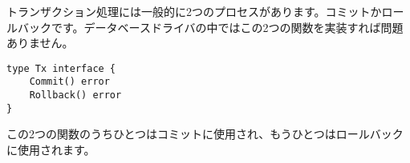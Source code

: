 トランザクション処理には一般的に2つのプロセスがあります。コミットかロールバックです。データベースドライバの中ではこの2つの関数を実装すれば問題ありません。

\begin{lstlisting}[numbers=none]
type Tx interface {
    Commit() error
    Rollback() error
}
\end{lstlisting}

この2つの関数のうちひとつはコミットに使用され、もうひとつはロールバックに使用されます。
